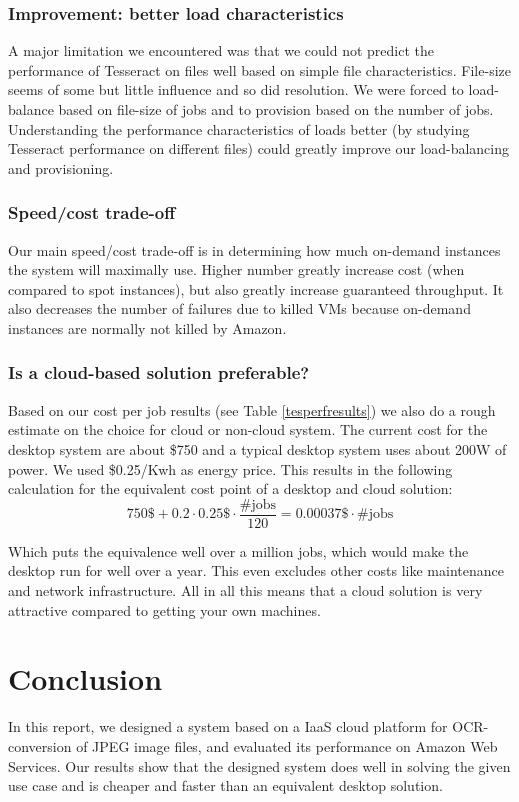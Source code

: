 \documentclass[a4paper]{IEEEtran}
\begin{document}
\subsubsection*{Improvement: better load characteristics}

A major limitation we encountered was that we could not predict the performance of Tesseract on files well based on simple file characteristics. File-size seems of some but little influence and so did resolution. We were forced to load-balance based on file-size of jobs and to provision based on the number of jobs. Understanding the performance characteristics of loads better (by studying Tesseract performance on different files) could greatly improve our load-balancing and provisioning.

\subsubsection*{Speed/cost trade-off}

Our main speed/cost trade-off is in determining how much on-demand instances the system will maximally use. Higher number greatly increase cost (when compared to spot instances), but also greatly increase guaranteed throughput. It also decreases the number of failures due to killed VMs because on-demand instances are normally not killed by Amazon.

\subsubsection*{Is a cloud-based solution preferable?}

Based on our cost per job results (see Table \ref{tesperfresults}) we also do a rough estimate on the choice for cloud or non-cloud system. The current cost for the desktop system are about \$750 and a typical desktop system uses about 200W of power. We used \$0.25/Kwh as energy price. This results in the following calculation for the equivalent cost point of a desktop and cloud solution:
$$
750\$ + 0.2 \cdot 0.25\$ \cdot \frac{\text{\#jobs}}{120} = 0.00037\$ \cdot \text{\#jobs}
$$

Which puts the equivalence well over a million jobs, which would make the desktop run for well over a year. This even excludes other costs like maintenance and network infrastructure. All in all this means that a cloud solution is very attractive compared to getting your own machines.
	
\section{Conclusion}
In this report, we designed a system based on a IaaS cloud platform for OCR-conversion of JPEG image files, and evaluated its performance on Amazon Web Services.
Our results show that the designed system does well in solving the given use case and is cheaper and faster than an equivalent desktop solution.
\end{document}
